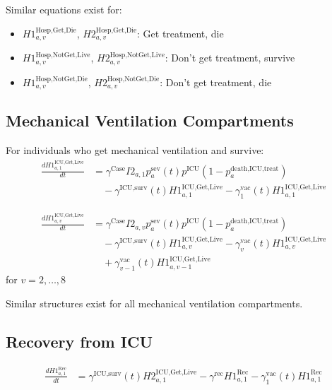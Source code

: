 \documentclass[12pt]{article}
\begin{document}
Similar equations exist for:
\begin{itemize}
    \item $H1^{\text{Hosp,Get,Die}}_{a,v}$, $H2^{\text{Hosp,Get,Die}}_{a,v}$: Get treatment, die
    \item $H1^{\text{Hosp,NotGet,Live}}_{a,v}$, $H2^{\text{Hosp,NotGet,Live}}_{a,v}$: Don't get treatment, survive
    \item $H1^{\text{Hosp,NotGet,Die}}_{a,v}$, $H2^{\text{Hosp,NotGet,Die}}_{a,v}$: Don't get treatment, die
\end{itemize}

\subsection{Mechanical Ventilation Compartments}

For individuals who get mechanical ventilation and survive:
\begin{align*}
\frac{dH1^{\text{ICU,Get,Live}}_{a,1}}{dt} &= \gamma^{\text{Case}} I2_{a,1} p^{\text{sev}}_a(t) p^{\text{ICU}} (1 - p^{\text{death,ICU,treat}}_a) \\
&\quad - \gamma^{\text{ICU,surv}}(t) H1^{\text{ICU,Get,Live}}_{a,1} - \gamma^{\text{vac}}_1(t) H1^{\text{ICU,Get,Live}}_{a,1}
\end{align*}

\begin{align*}
\frac{dH1^{\text{ICU,Get,Live}}_{a,v}}{dt} &= \gamma^{\text{Case}} I2_{a,v} p^{\text{sev}}_a(t) p^{\text{ICU}} (1 - p^{\text{death,ICU,treat}}_a) \\
&\quad - \gamma^{\text{ICU,surv}}(t) H1^{\text{ICU,Get,Live}}_{a,v} - \gamma^{\text{vac}}_v(t) H1^{\text{ICU,Get,Live}}_{a,v} \\
&\quad + \gamma^{\text{vac}}_{v-1}(t) H1^{\text{ICU,Get,Live}}_{a,v-1}
\end{align*}
for $v = 2, \ldots, 8$

Similar structures exist for all mechanical ventilation compartments.

\subsection{Recovery from ICU}

\begin{align*}
\frac{dH1^{\text{Rec}}_{a,1}}{dt} &= \gamma^{\text{ICU,surv}}(t) H2^{\text{ICU,Get,Live}}_{a,1} - \gamma^{\text{rec}} H1^{\text{Rec}}_{a,1} - \gamma^{\text{vac}}_1(t) H1^{\text{Rec}}_{a,1}
\end{align*}
\end{document}
